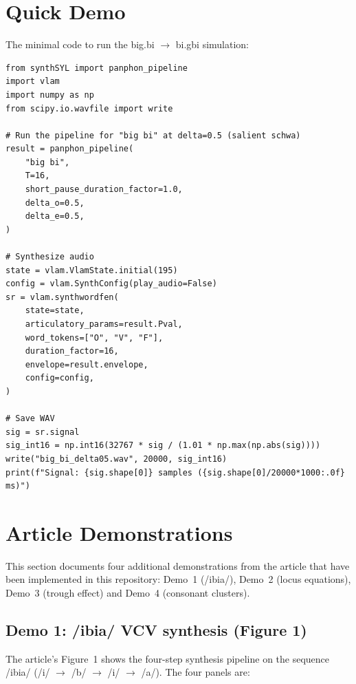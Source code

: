 \documentclass[11pt,a4paper]{article}
\begin{document}
\section{Quick Demo}

The minimal code to run the big.bi $\to$ bi.gbi simulation:

\begin{lstlisting}
from synthSYL import panphon_pipeline
import vlam
import numpy as np
from scipy.io.wavfile import write

# Run the pipeline for "big bi" at delta=0.5 (salient schwa)
result = panphon_pipeline(
    "big bi",
    T=16,
    short_pause_duration_factor=1.0,
    delta_o=0.5,
    delta_e=0.5,
)

# Synthesize audio
state = vlam.VlamState.initial(195)
config = vlam.SynthConfig(play_audio=False)
sr = vlam.synthwordfen(
    state=state,
    articulatory_params=result.Pval,
    word_tokens=["O", "V", "F"],
    duration_factor=16,
    envelope=result.envelope,
    config=config,
)

# Save WAV
sig = sr.signal
sig_int16 = np.int16(32767 * sig / (1.01 * np.max(np.abs(sig))))
write("big_bi_delta05.wav", 20000, sig_int16)
print(f"Signal: {sig.shape[0]} samples ({sig.shape[0]/20000*1000:.0f} ms)")
\end{lstlisting}

\section{Article Demonstrations}

This section documents four additional demonstrations from the article
that have been implemented in this repository: Demo~1 (/ibia/),
Demo~2 (locus equations), Demo~3 (trough effect) and Demo~4
(consonant clusters).

\subsection{Demo 1: /ibia/ VCV synthesis (Figure 1)}

The article's Figure~1 shows the four-step synthesis pipeline on the
sequence /ibia/ (/i/ $\to$ /b/ $\to$ /i/ $\to$ /a/). The four panels
are:
\end{document}
